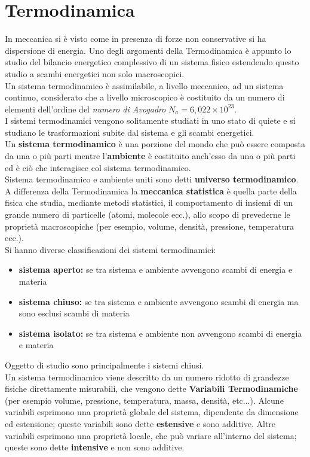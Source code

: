 \documentclass[a4paper,12pt, oneside]{book}
\begin{document}
\chapter{Termodinamica}
In meccanica si è visto come in presenza di forze non conservative si ha dispersione di energia. Uno degli argomenti della Termodinamica è appunto lo studio del bilancio energetico complessivo di un sistema fisico estendendo questo studio a scambi energetici non solo macroscopici. \\
Un sistema termodinamico è assimilabile, a livello meccanico, ad un sistema continuo, considerato che a livello microscopico è costituito da un numero di elementi dell'ordine del \textit{numero di Avogadro} $N_a=6,022\times 10^{23}$.\\
I sistemi termodinamici vengono solitamente studiati in uno stato di quiete e si studiano le trasformazioni subite dal sistema e gli scambi energetici.\\
Un \textbf{sistema termodinamico} è una porzione del mondo che può essere composta da una o più parti mentre l'\textbf{ambiente} è costituito anch'esso da una o più parti ed è ciò che interagisce col sistema termodinamico. \\
Sistema termodinamico e ambiente uniti sono detti \textbf{universo termodinamico}.\\
A differenza della Termodinamica la \textbf{meccanica statistica} è quella parte della fisica che studia, mediante metodi statistici, il comportamento di insiemi di un grande numero di particelle (atomi, molecole ecc.), allo scopo di prevederne le proprietà macroscopiche (per esempio, volume, densità, pressione, temperatura ecc.).\\
Si hanno diverse classificazioni dei sistemi termodinamici:
\begin{itemize}
	\item \textbf{sistema aperto:} se tra sistema e ambiente avvengono scambi di energia e materia
	\item \textbf{sistema chiuso:} se tra sistema e ambiente avvengono scambi di energia ma sono esclusi scambi di materia
	\item \textbf{sistema isolato:} se tra sistema e ambiente non avvengono scambi di energia e materia
\end{itemize}
Oggetto di studio sono principalmente i sistemi chiusi.\\
Un sistema termodinamico viene descritto da un numero ridotto di grandezze fisiche direttamente misurabili, che vengono dette \textbf{Variabili Termodinamiche} (per esempio volume, pressione, temperatura, massa, densità, etc...). Alcune variabili esprimono una proprietà globale del sistema, dipendente da dimensione ed estensione; queste variabili sono dette \textbf{estensive} e sono additive. Altre variabili esprimono una proprietà locale, che può variare all'interno del sistema; queste sono dette \textbf{intensive} e non sono additive.\\
\end{document}
